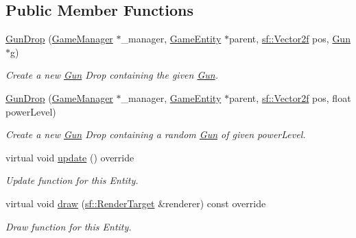 \subsection*{Public Member Functions}
\begin{DoxyCompactItemize}
\item 
\mbox{\hyperlink{class_gun_drop_a0c55c4a40bababe650204ca9d004e43e}{Gun\+Drop}} (\mbox{\hyperlink{class_game_manager}{Game\+Manager}} $\ast$\+\_\+manager, \mbox{\hyperlink{class_game_entity}{Game\+Entity}} $\ast$parent, \mbox{\hyperlink{classsf_1_1_vector2}{sf\+::\+Vector2f}} pos, \mbox{\hyperlink{class_gun}{Gun}} $\ast$g)
\begin{DoxyCompactList}\small\item\em Create a new \mbox{\hyperlink{class_gun}{Gun}} Drop containing the given \mbox{\hyperlink{class_gun}{Gun}}. \end{DoxyCompactList}\item 
\mbox{\hyperlink{class_gun_drop_abf97e26fbd4dda8c7143128e0ecd0981}{Gun\+Drop}} (\mbox{\hyperlink{class_game_manager}{Game\+Manager}} $\ast$\+\_\+manager, \mbox{\hyperlink{class_game_entity}{Game\+Entity}} $\ast$parent, \mbox{\hyperlink{classsf_1_1_vector2}{sf\+::\+Vector2f}} pos, float power\+Level)
\begin{DoxyCompactList}\small\item\em Create a new \mbox{\hyperlink{class_gun}{Gun}} Drop containing a random \mbox{\hyperlink{class_gun}{Gun}} of given power\+Level. \end{DoxyCompactList}\item 
\mbox{\label{class_gun_drop_aba7b2ebe51dcef4c5b98591e143254fa}} 
virtual void \mbox{\hyperlink{class_gun_drop_aba7b2ebe51dcef4c5b98591e143254fa}{update}} () override
\begin{DoxyCompactList}\small\item\em Update function for this Entity. \end{DoxyCompactList}\item 
virtual void \mbox{\hyperlink{class_gun_drop_a418a09a73fbb7e710065c8a2c525a866}{draw}} (\mbox{\hyperlink{classsf_1_1_render_target}{sf\+::\+Render\+Target}} \&renderer) const override
\begin{DoxyCompactList}\small\item\em Draw function for this Entity. \end{DoxyCompactList}\item 
\mbox{\label{class_gun_drop_a273ef560bce34947f553c95e3786c20b}} 

\end{DoxyCompactItemize}
